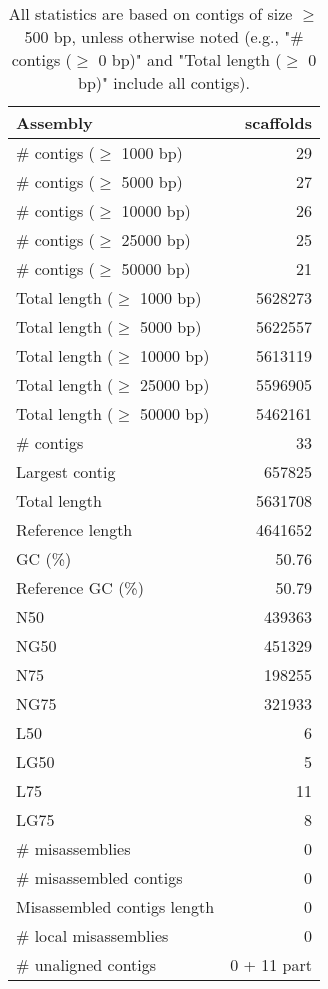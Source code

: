 \documentclass[12pt,a4paper]{article}
\begin{document}
\begin{table}[ht]
\begin{center}
\caption{All statistics are based on contigs of size $\geq$ 500 bp, unless otherwise noted (e.g., "\# contigs ($\geq$ 0 bp)" and "Total length ($\geq$ 0 bp)" include all contigs).}
\begin{tabular}{|l*{1}{|r}|}
\hline
Assembly & scaffolds \\ \hline
\# contigs ($\geq$ 1000 bp) & 29 \\ \hline
\# contigs ($\geq$ 5000 bp) & 27 \\ \hline
\# contigs ($\geq$ 10000 bp) & 26 \\ \hline
\# contigs ($\geq$ 25000 bp) & 25 \\ \hline
\# contigs ($\geq$ 50000 bp) & 21 \\ \hline
Total length ($\geq$ 1000 bp) & 5628273 \\ \hline
Total length ($\geq$ 5000 bp) & 5622557 \\ \hline
Total length ($\geq$ 10000 bp) & 5613119 \\ \hline
Total length ($\geq$ 25000 bp) & 5596905 \\ \hline
Total length ($\geq$ 50000 bp) & 5462161 \\ \hline
\# contigs & 33 \\ \hline
Largest contig & 657825 \\ \hline
Total length & 5631708 \\ \hline
Reference length & 4641652 \\ \hline
GC (\%) & 50.76 \\ \hline
Reference GC (\%) & 50.79 \\ \hline
N50 & 439363 \\ \hline
NG50 & 451329 \\ \hline
N75 & 198255 \\ \hline
NG75 & 321933 \\ \hline
L50 & 6 \\ \hline
LG50 & 5 \\ \hline
L75 & 11 \\ \hline
LG75 & 8 \\ \hline
\# misassemblies & 0 \\ \hline
\# misassembled contigs & 0 \\ \hline
Misassembled contigs length & 0 \\ \hline
\# local misassemblies & 0 \\ \hline
\# unaligned contigs & 0 + 11 part \\ \hline

\end{tabular}
\end{center}
\end{table}
\end{document}
